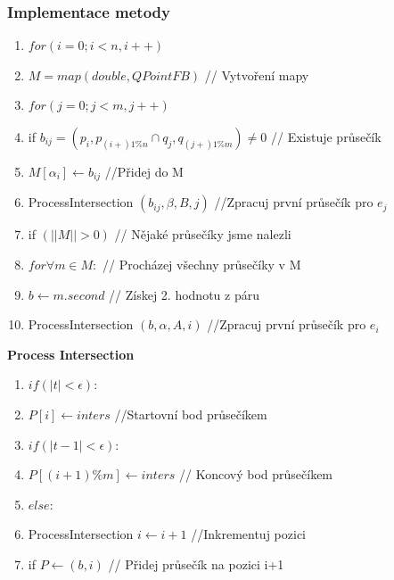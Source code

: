 \documentclass[a4paper, 12pt]{article}
\begin{document}
\subsubsection{Implementace metody}
\begin{enumerate}
\item $ for (i = 0; i < n, i++) $ 
\item \hspace {1cm} $ M = map (double, QPointFB) $ // Vytvoření mapy 
\item \hspace {1cm} $ for (j = 0; j < m, j++) $
\item \hspace {2cm} if $ b_{ij} = (p_i, p_{(i+)1\%n} \cap q_j, q_{(j+)1\%m }) \neq 0$ // Existuje průsečík
\item \hspace {3cm} $ M [\alpha_i] \longleftarrow b_{ij}$ //Přidej do M
\item \hspace {3cm} ProcessIntersection $ (b_{ij}, \beta, B, j) $ //Zpracuj první průsečík pro $ e_j $
\item \hspace {1cm} if $(||M|| > 0)$ // Nějaké průsečíky jsme nalezli
\item \hspace{2cm} $  for \forall m \in M: $ // Procházej všechny průsečíky v M
\item  \hspace{3cm} $ b \longleftarrow m.second $ // Získej 2. hodnotu z páru
\item \hspace{3cm} ProcessIntersection $ (b, \alpha, A, i) $ //Zpracuj první průsečík pro $ e_i $
\end{enumerate}

\textbf{Process Intersection} 
\begin{enumerate}
	\item $ if (|t| < \epsilon): $ 
	\item \hspace {1cm} $ P[i] \longleftarrow inters $  //Startovní bod průsečíkem
	\item  $ if (|t-1| < \epsilon): $
	\item \hspace {1cm}  $ P[(i+1)\%m] \longleftarrow inters$ // Koncový bod průsečíkem
	\item  $ else:$
	\item \hspace {1cm} ProcessIntersection $ i \longleftarrow i+1 $ //Inkrementuj pozici
	\item \hspace {1cm} if $P \longleftarrow  (b,i)$ // Přidej průsečík na pozici i+1
\end{enumerate}
\end{document}
